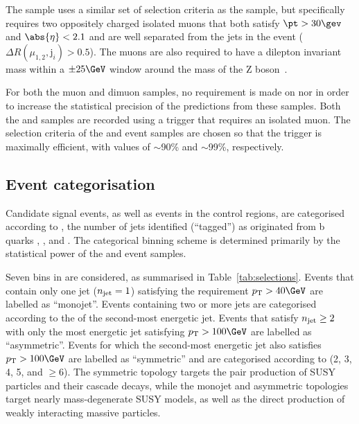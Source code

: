 The \mmj sample uses a similar set of selection criteria as the \mj
sample, but specifically requires two oppositely charged isolated
muons that both satisfy $\pt > 30\gev$ and $\abs{\eta} < 2.1$ and are
well separated from the jets in the event ($\Delta
R(\mu_{1,2},\mathrm{j}_i) > 0.5$). The muons are also required to have
a dilepton invariant mass within a $\pm 25\GeV$ window around the
mass of the Z boson~\cite{1674-1137-38-9-090001}. 

For both the muon and dimuon samples, no requirement is made on
\alphat nor \bdphi in order to increase the statistical precision of
the predictions from these samples. Both the \mj and \mmj samples are
recorded using a trigger that requires an isolated muon. The selection
criteria of the \mj and \mmj event samples are chosen so that the
trigger is maximally efficient, with values of $\sim$90\% and
$\sim$99\%, respectively.


\subsection{Event categorisation}
\label{sec:categorisation}

Candidate signal events, as well as events in the control regions, are
categorised according to \njet, the number of jets identified
(``tagged'') as originated from b quarks \nb, \scalht, and \mht. The
categorical binning scheme is determined primarily by the statistical
power of the \mj and \mmj event samples.

Seven bins in \njet are considered, as summarised in
Table~\ref{tab:selections}. Events that contain only one jet ($n_{\mathrm{jet}} =
1$) satisfying the requirement $\Pt > 40\GeV$ are labelled as
``monojet''. Events containing two or more jets are categorised
according to the \Pt of the second-most energetic jet. Events that
satisfy $n_{\mathrm{jet}} \geq 2$ with only the most energetic jet satisfying
$\Pt > 100\GeV$ are labelled as ``asymmetric''. Events for which the
second-most energetic jet also satisfies $\Pt > 100\GeV$ are labelled
as ``symmetric'' and are categorised according to \njet (2, 3, 4, 5,
and $\geq$6). The symmetric topology targets the pair production of
SUSY particles and their cascade decays, while the monojet and
asymmetric topologies target nearly mass-degenerate SUSY models, as
well as the direct production of weakly interacting massive particles.

